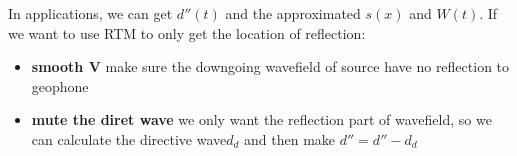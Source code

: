 \documentclass[a4paper]{article}
\begin{document}
	In applications, we can get $d''(t)$ and the approximated $s(x)$ and $W(t)$. If we want to use RTM to only get the location of reflection:
	\begin{itemize}
		\item \textbf{smooth V} make sure the downgoing wavefield of source have no reflection to geophone
		\item \textbf{mute the diret wave} we only want the reflection part of wavefield, so we can calculate the directive wave$d_d$ and then make $d''=d''-d_d$
	\end{itemize}


	



\end{document}
